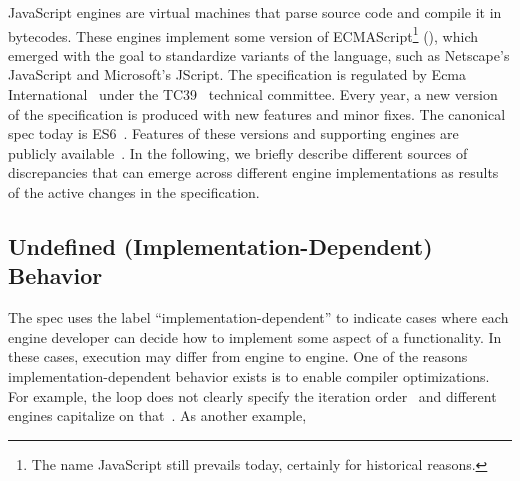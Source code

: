 \documentclass[10pt,conference,anonymous]{IEEEtran}
\begin{document}
JavaScript engines are virtual machines that parse source code and
compile it in bytecodes. These engines implement some version of
ECMAScript\footnote{The name JavaScript still prevails today,
  certainly for historical reasons.} (\es{}), which emerged with the
goal to standardize variants of the language, such as Netscape's
JavaScript and Microsoft's JScript. The \es{} specification is
regulated by Ecma International~\cite{es6-website} under the
TC39~\cite{tc39-github} technical committee.  Every year, a new
version of the \es{} specification is produced with new features and
minor fixes. The canonical spec today is
ES6~\cite{ecmas262-spec-repo,ecmas262-spec}. Features of these
versions and supporting engines are publicly available~\cite{kangax}.
In the following, we briefly describe different sources of
discrepancies that can emerge across different engine implementations
as results of the active changes in the \es{} specification.



\subsection{Undefined (Implementation-Dependent) Behavior}
\label{sec:imp-dep-behavior}


The \es{} spec uses the label ``implementation-dependent'' to indicate
cases where each engine developer can decide how to implement some
aspect of a functionality. In these cases, execution may differ from
engine to engine. One of the reasons implementation-dependent behavior
exists is to enable compiler optimizations. For example, the
 loop does not clearly specify the iteration
order~\cite{so-forin-undefined,javascript-in-chrome} and different
engines capitalize on that~\cite{for-in-undefined}. As another
example, 

\end{document}
